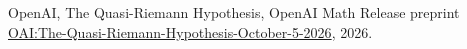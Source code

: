 OpenAI,
The Quasi-Riemann Hypothesis,
OpenAI Math Release preprint
\href{https://github.com/openai/math/blob/fd4aeeb2ee4fc729c18d98444fed42fd0529eeeb/preprints/The-Quasi-Riemann-Hypothesis-October-5-2026/paper2.pdf}{OAI:The-Quasi-Riemann-Hypothesis-October-5-2026},
2026.

